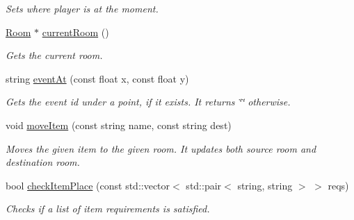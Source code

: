 \begin{DoxyCompactItemize}
\begin{DoxyCompactList}\small\item\em Sets where player is at the moment. \item\end{DoxyCompactList}\item 
\hypertarget{classRoomsManager_adbfbdfb3632762bb5e02c0370e07b36a}{
\hyperlink{classRoom}{Room} $\ast$ \hyperlink{classRoomsManager_adbfbdfb3632762bb5e02c0370e07b36a}{currentRoom} ()}
\label{classRoomsManager_adbfbdfb3632762bb5e02c0370e07b36a}

\begin{DoxyCompactList}\small\item\em Gets the current room. \item\end{DoxyCompactList}\item 
\hypertarget{classRoomsManager_ab7f16759f75297b158badfa62daaf10e}{
string \hyperlink{classRoomsManager_ab7f16759f75297b158badfa62daaf10e}{eventAt} (const float x, const float y)}
\label{classRoomsManager_ab7f16759f75297b158badfa62daaf10e}

\begin{DoxyCompactList}\small\item\em Gets the event id under a point, if it exists. It returns \char`\"{}\char`\"{} otherwise. \item\end{DoxyCompactList}\item 
\hypertarget{classRoomsManager_a5fa5a95b6658d68a34c9ca6338154e4a}{
void \hyperlink{classRoomsManager_a5fa5a95b6658d68a34c9ca6338154e4a}{moveItem} (const string name, const string dest)}
\label{classRoomsManager_a5fa5a95b6658d68a34c9ca6338154e4a}

\begin{DoxyCompactList}\small\item\em Moves the given item to the given room. It updates both source room and destination room. \item\end{DoxyCompactList}\item 
\hypertarget{classRoomsManager_a4a97e200c538e9ff7ae3c8facea7586a}{
bool \hyperlink{classRoomsManager_a4a97e200c538e9ff7ae3c8facea7586a}{checkItemPlace} (const std::vector$<$ std::pair$<$ string, string $>$ $>$ reqs)}
\label{classRoomsManager_a4a97e200c538e9ff7ae3c8facea7586a}

\begin{DoxyCompactList}\small\item\em Checks if a list of item requirements is satisfied. \item\end{DoxyCompactList}\end{DoxyCompactItemize}


